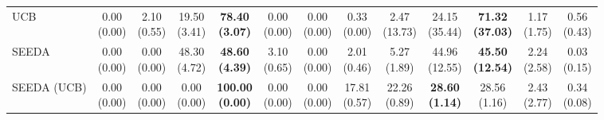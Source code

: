 \begin{table}[H]
{\begin{tabular}{l|cccccc|cccccc}
UCB & \makecell{0.00 \\ (0.00)} & \makecell{2.10 \\ (0.55)} & {\cellcolor[HTML]{C8E6C9}} \makecell{19.50 \\ (3.41)} & \bfseries \makecell{78.40 \\ (3.07)} & \makecell{0.00 \\ (0.00)} & \makecell{0.00 \\ (0.00)} & \makecell{0.33 \\ (0.00)} & \makecell{2.47 \\ (13.73)} & {\cellcolor[HTML]{C8E6C9}} \makecell{24.15 \\ (35.44)} & \bfseries \makecell{71.32 \\ (37.03)} & \makecell{1.17 \\ (1.75)} & \makecell{0.56 \\ (0.43)} \\
SEEDA & \makecell{0.00 \\ (0.00)} & \makecell{0.00 \\ (0.00)} & {\cellcolor[HTML]{C8E6C9}} \makecell{48.30 \\ (4.72)} & \bfseries \makecell{48.60 \\ (4.39)} & \makecell{3.10 \\ (0.65)} & \makecell{0.00 \\ (0.00)} & \makecell{2.01 \\ (0.46)} & \makecell{5.27 \\ (1.89)} & {\cellcolor[HTML]{C8E6C9}} \makecell{44.96 \\ (12.55)} & \bfseries \makecell{45.50 \\ (12.54)} & \makecell{2.24 \\ (2.58)} & \makecell{0.03 \\ (0.15)} \\
SEEDA (UCB) & \makecell{0.00 \\ (0.00)} & \makecell{0.00 \\ (0.00)} & {\cellcolor[HTML]{C8E6C9}} \makecell{0.00 \\ (0.00)} & \bfseries \makecell{100.00 \\ (0.00)} & \makecell{0.00 \\ (0.00)} & \makecell{0.00 \\ (0.00)} & \makecell{17.81 \\ (0.57)} & \makecell{22.26 \\ (0.89)} & {\cellcolor[HTML]{C8E6C9}} \bfseries \makecell{28.60 \\ (1.14)} & \makecell{28.56 \\ (1.16)} & \makecell{2.43 \\ (2.77)} & \makecell{0.34 \\ (0.08)} \\

\end{tabular}}
\end{table}
